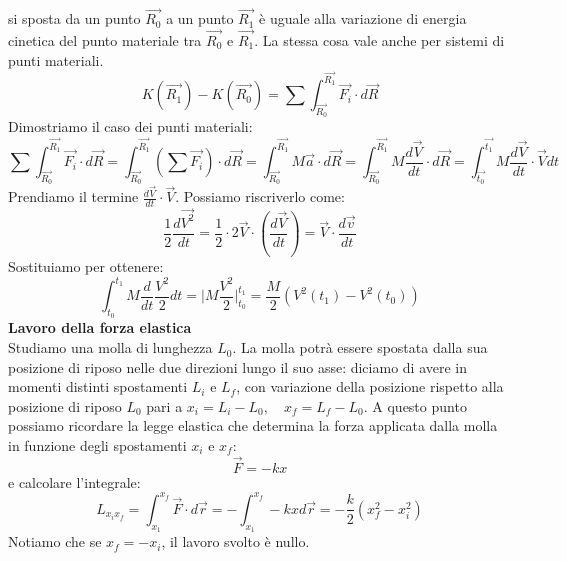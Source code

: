 \documentclass[a4paper,12pt]{article}
\begin{document}
si sposta da un punto $\vec{R_0}$ a un punto $\vec{R_1}$ è uguale alla variazione di energia cinetica del punto materiale
tra $\vec{R_0}$ e $\vec{R_1}$. La stessa cosa vale anche per sistemi di punti materiali.
$$ K({\vec{R_1}}) - K({\vec{R_0}}) = \sum\int_{\vec{R_0}}^{\vec{R_1}} \vec{F_i} \cdot d\vec{R} $$
Dimostriamo il caso dei punti materiali:
$$ \sum\int_{\vec{R_0}}^{\vec{R_1}} \vec{F_i} \cdot d\vec{R} = \int_{\vec{R_0}}^{\vec{R_1}} (\sum{\vec{F_i}}) \cdot d\vec{R} = \int_{\vec{R_0}}^{\vec{R_1}} M\vec{a} \cdot d\vec{R}
= \int_{\vec{R_0}}^{\vec{R_1}} M\frac{d\vec{V}}{dt} \cdot d\vec{R} = \int_{\vec{t_0}}^{\vec{t_1}} M\frac{d\vec{V}}{dt} \cdot \vec{V} dt$$
Prendiamo il termine $\frac{d\vec{V}}{dt}\cdot\vec{V}$. Possiamo riscriverlo come:
$$ \frac{1}{2}\frac{d\vec{V^2}}{dt} = \frac{1}{2} \cdot 2\vec{V} \cdot(\frac{d\vec{V}}{dt}) = \vec{V} \cdot \frac{d\vec{v}}{dt}$$
Sostituiamo per ottenere:
$$ \int_{t_0}^{t_1} M \frac{d}{dt} \frac{V^2}{2} dt = \Bigg|M\frac{V^2}{2}\Bigg|_{t_0}^{t_1} = \frac{M}{2}(V^2(t_1) - V^2(t_0))$$
\textbf{Lavoro della forza elastica} \\
Studiamo una molla di lunghezza $L_0$. La molla potrà essere spostata dalla sua posizione di riposo nelle due direzioni lungo il suo asse:
diciamo di avere in momenti distinti spostamenti $L_i$ e $L_f$, con variazione della posizione rispetto alla posizione di riposo $L_0$ pari
a $x_i = L_i - L_0, \quad x_f = L_f - L_0 $. A questo punto possiamo ricordare la legge elastica che determina
la forza applicata dalla molla in funzione degli spostamenti $x_i$ e $x_f$:
$$ \vec{F} = -kx $$
e calcolare l'integrale:
$$ L_{x_ix_f} = \int_{x_1}^{x_f} \vec{F} \cdot d\vec{r} = -\int_{x_1}^{x_f} -kx d\vec{r} = -\frac{k}{2}(x_f^2 - x_i^2) $$
Notiamo che se $x_f = -x_i$, il lavoro svolto è nullo.
\end{document}
